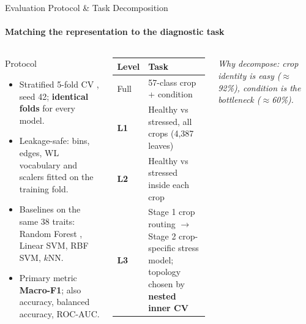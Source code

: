 \documentclass[aspectratio=169, 11pt]{beamer}
\begin{document}
\begin{frame}{Evaluation Protocol \& Task Decomposition}
    \framesubtitle{Matching the representation to the diagnostic task}
    \begin{columns}[T]
        \begin{block}{Protocol}
            \scriptsize
            \begin{itemize}
                \item Stratified 5-fold CV \cite{kohavi1995study}, seed 42; \textbf{identical folds} for every model.
                \item Leakage-safe: bins, edges, WL vocabulary and scalers fitted on the training fold.
                \item Baselines on the same 38 traits: Random Forest \cite{breiman2001random}, Linear SVM, RBF SVM, $k$NN.
                \item Primary metric \textbf{Macro-F1}; also accuracy, balanced accuracy, ROC-AUC.
            \end{itemize}
        \end{block}

        \scriptsize
        \renewcommand{\arraystretch}{1.3}
        \begin{tabular}{@{}l L{5.2cm}@{}}
            \toprule
            \textbf{Level} & \textbf{Task} \\
            \midrule
            Full & 57-class crop + condition \\
            \textbf{L1} & Healthy vs stressed, all crops (4,387 leaves) \\
            \textbf{L2} & Healthy vs stressed inside each crop \\
            \textbf{L3} & Stage 1 crop routing $\rightarrow$ Stage 2 crop-specific stress model; topology chosen by \textbf{nested inner CV} \\
            \bottomrule
        \end{tabular}

        \vspace{0.15cm}
        {\scriptsize\itshape Why decompose: crop identity is easy ($\approx$92\%), condition is the bottleneck ($\approx$60\%).}
    \end{columns}
\end{frame}
\end{document}
